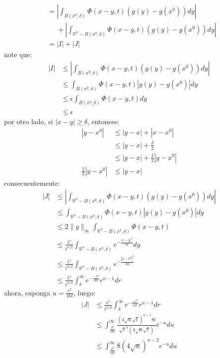 \begin{homeworkProblem}
\begin{solucion}
\begin{enumerate}
\begin{align*}
        &=\left| \int_{B(x^{0},\delta)}\Phi(x-y,t)(g(y)-g(x^0))dy \right|\\
        &\phantom{=}+\left| \int_{\mathbb{R}^{n}-B(x^{0},\delta)}\Phi(x-y,t)(g(y)-g(x^0))dy \right|\\
        &=|I|+|J|
      \end{align*}
      note que:
      \begin{align*}
        |I|&\leq\left| \int_{B(x^{0},\delta)}\Phi(x-y,t)(g(y)-g(x^0))dy \right|\\
        &\leq \int_{B(x^{0},\delta)}\Phi(x-y,t)|g(y)-g(x^0)|dy\\
        &\leq \epsilon \int_{B(x^{0},\delta)}\Phi(x-y,t)dy\\
        &\leq \epsilon
      \end{align*}
      por otro lado, si $|x-y|\geq \delta$, entonces:
      \begin{align*}
        |y-x^0|&\leq|y-x|+|x-x^0|\\
        &\leq |y-x|+\frac{\delta}{2}\\
        &\leq |y-x|+\frac{1}{2}|y-x^0|\\
        \frac{1}{2}|y-x^0|&\leq|y-x|
      \end{align*}
      consecuentemente:
      \begin{align*}
        |J|&\leq \left| \int_{\mathbb{R}^{n}-B(x^{0},\delta)}\Phi(x-y,t)(g(y)-g(x^0))dy \right|\\
        &\leq \int_{\mathbb{R}^{n}-B(x^{0},\delta)}\Phi(x-y,t)|g(y)-g(x^0)|dy\\
        &\leq 2\|g\|_\infty\int_{\mathbb{R}^{n}-B(x^{0},\delta)}\Phi(x-y,t)\\
        &\leq \frac{C}{t^{n/2}}\int_{\mathbb{R}^{n}-B(x^{0},\delta)}e^{-\frac{|x-y|^2}{4t}}dy\\
        &\leq \frac{C}{t^{n/2}}\int_{\mathbb{R}^{n}-B(x^{0},\delta)}e^{-\frac{|y-x^0|^2}{16t}}\\
        &\leq \frac{C}{t^{n/2}}\int_{\delta}^{\infty}e^{-\frac{-r^2}{16t}}r^{n-1}dr
      \end{align*}
      ahora, suponga $u=\frac{r^2}{16t}$, luego:
      \begin{align*}
        |J|&\leq \frac{C}{t^{n/2}}\int_{\delta}^{\infty}e^{-\frac{-r^2}{16t}}r^{n-1}dr\\
        &\leq\int_{\frac{\delta^2}{16t}}^{\infty}\frac{(4\sqrt{u}\sqrt{t})^{n-1}8t}{\sqrt{t}^n (4\sqrt{u}\sqrt{t})}e^{-u}du\\
        &\leq \int_{\frac{\delta^2}{16t}}^{\infty}8(4\sqrt{u})^{n-2}e^{-u}du

\end{align*}
\end{enumerate}
\end{solucion}
\end{homeworkProblem}
